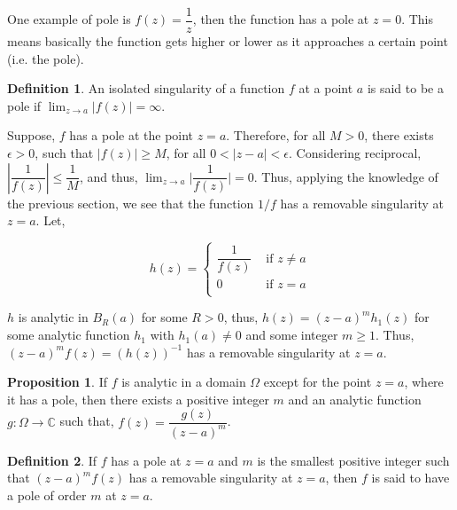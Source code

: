 \documentclass[12pt]{article}
\newcommand{\C}{\mathbb{C}}
\theoremstyle{definition}
\newtheorem{defn}{Definition}
\newtheorem{prop}{Proposition}
\newenvironment{definition}{
\begin{tcolorbox}[colback=green!5!white,colframe=green!75!black, parbox = false]\begin{defn} }{\end{defn}\end{tcolorbox} }
\newenvironment{proposition}{
\begin{tcolorbox}[colback=green!5!white,colframe=green!75!black, parbox = false]\begin{prop} }{\end{prop}\end{tcolorbox} }
\newenvironment{example}{
\begin{tcolorbox}[colback=blue!5!white,colframe=blue!75!black, title = Example, parbox = false] }{\end{tcolorbox} }
\begin{document}
\begin{example}
    One example of pole is $f(z) = \dfrac{1}{z}$, then the function has a pole at $z = 0$. This means basically the function gets higher or lower as it approaches a certain point (i.e. the pole).
\end{example}

\begin{definition}
    An isolated singularity of a function $f$ at a point $a$ is said to be a pole if $\lim_{z \rightarrow a} \vert f(z) \vert = \infty$.
\end{definition}

Suppose, $f$ has a pole at the point $z = a$. Therefore, for all $M > 0$, there exists $\epsilon > 0$, such that $\vert f(z) \vert \geq M$, for all $0 < \vert z - a\vert < \epsilon$. Considering reciprocal, $\left\vert \dfrac{1}{f(z)} \right\vert \leq \dfrac{1}{M}$, and thus, $\lim_{z \rightarrow a} \vert \dfrac{1}{f(z)} \vert = 0$. Thus, applying the knowledge of the previous section, we see that the function $1/f$ has a removable singularity at $z = a$. Let, 

$$
h(z) = \begin{cases}
    \dfrac{1}{f(z)} & \text{ if } z \neq a\\
    0 & \text{ if } z= a\\
\end{cases}
$$

$h$ is analytic in $B_R(a)$ for some $R > 0$, thus, $h(z) = (z - a)^m h_1(z)$ for some analytic function $h_1$ with $h_1(a) \neq 0$ and some integer $m \geq 1$. Thus, $(z - a)^m f(z) = (h(z))^{-1}$ has a removable singularity at $z = a$. 

\begin{proposition}
    If $f$ is analytic in a domain $\Omega$ except for the point $z = a$, where it has a pole, then there exists a positive integer $m$ and an analytic function $g : \Omega \rightarrow \C$ such that, $f(z) = \dfrac{g(z)}{(z - a)^m}$.
\end{proposition}

\begin{definition}
    If $f$ has a pole at $z = a$ and $m$ is the smallest positive integer such that $(z - a)^m f(z)$ has a removable singularity at $z = a$, then $f$ is said to have a pole of order $m$ at $z = a$.
\end{definition}
\end{document}
